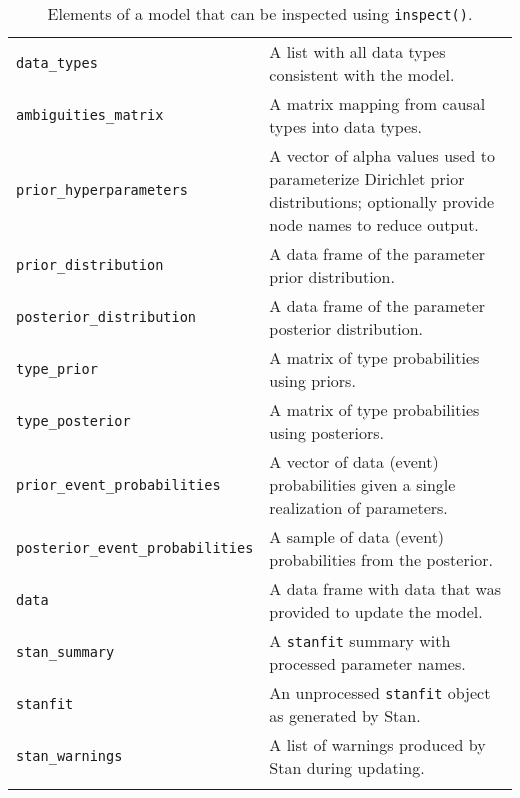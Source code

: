 \begin{longtable}[]{@{}
  >{\raggedright\arraybackslash}p{}
  >{\raggedright\arraybackslash}p{}@{}}
\texttt{data\_types} & A list with all data types consistent with the
model. \\

\texttt{ambiguities\_matrix} & A matrix mapping from causal types into
data types. \\

\texttt{prior\_hyperparameters} & A vector of alpha values used to
parameterize Dirichlet prior distributions; optionally provide node
names to reduce output. \\

\texttt{prior\_distribution} & A data frame of the parameter prior
distribution. \\

\texttt{posterior\_distribution} & A data frame of the parameter
posterior distribution. \\

\texttt{type\_prior} & A matrix of type probabilities using priors. \\

\texttt{type\_posterior} & A matrix of type probabilities using
posteriors. \\

\texttt{prior\_event\_probabilities} & A vector of data (event)
probabilities given a single realization of parameters. \\

\texttt{posterior\_event\_probabilities} & A sample of data (event)
probabilities from the posterior. \\

\texttt{data} & A data frame with data that was provided to update the
model. \\

\texttt{stan\_summary} & A \texttt{stanfit} summary with processed
parameter names. \\

\texttt{stanfit} & An unprocessed \texttt{stanfit} object as generated
by Stan. \\

\texttt{stan\_warnings} & A list of warnings produced by Stan during
updating. \\

\bottomrule
\caption{Elements of a model that can be inspected using
\texttt{inspect()}.}\label{tbl-core}\tabularnewline
\end{longtable}
